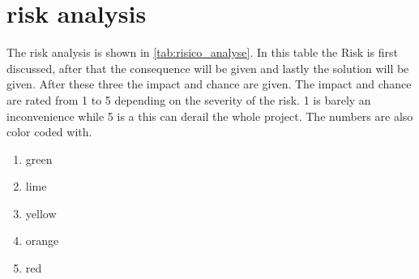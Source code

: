 \newpage

\thispagestyle{empty}
\section{risk analysis}
The risk analysis is shown in \autoref{tab:risico_analyse}. In this table the Risk is first discussed, after that the consequence will be given and lastly the solution will be given. After these three the impact and chance are given. The impact and chance are rated from 1 to 5 depending on the severity of the risk. 1 is barely an inconvenience while 5 is a this can derail the whole project. The numbers are also color coded with.

\begin{enumerate}
\item green
\item lime
\item yellow
\item orange
\item red
\end{enumerate}

\setcounter{riskTableCounter}{1}

